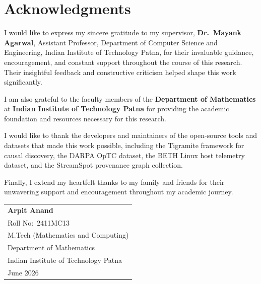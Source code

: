 \chapter*{Acknowledgments}

I would like to express my sincere gratitude to my supervisor, \textbf{Dr.\ Mayank Agarwal}, Assistant Professor, Department of Computer Science and Engineering, Indian Institute of Technology Patna, for their invaluable guidance, encouragement, and constant support throughout the course of this research. Their insightful feedback and constructive criticism helped shape this work significantly.

I am also grateful to the faculty members of the \textbf{Department of Mathematics} at \textbf{Indian Institute of Technology Patna} for providing the academic foundation and resources necessary for this research.

I would like to thank the developers and maintainers of the open-source tools and datasets that made this work possible, including the Tigramite framework for causal discovery, the DARPA OpTC dataset, the BETH Linux host telemetry dataset, and the StreamSpot provenance graph collection.

Finally, I extend my heartfelt thanks to my family and friends for their unwavering support and encouragement throughout my academic journey.

\vfill

\noindent
\begin{tabular}{@{}l@{}}
\textbf{Arpit Anand} \\[4pt]
Roll No:\ 2411MC13 \\
M.Tech (Mathematics and Computing) \\
Department of Mathematics \\
Indian Institute of Technology Patna \\
June 2026
\end{tabular}

\vspace{2cm}
